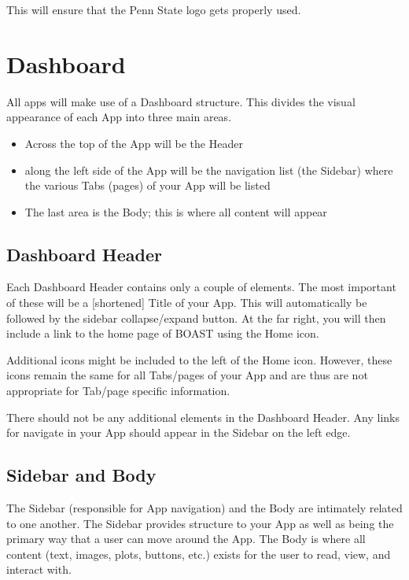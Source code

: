 \documentclass[]{book}
\providecommand{\tightlist}{%
  \setlength{\itemsep}{0pt}\setlength{\parskip}{0pt}}
\begin{document}
This will ensure that the Penn State logo gets properly used.

\hypertarget{dashboard}{%
\section{Dashboard}\label{dashboard}}

All apps will make use of a Dashboard structure. This divides the visual appearance of each App into three main areas.

\begin{itemize}
\tightlist
\item
  Across the top of the App will be the Header
\item
  along the left side of the App will be the navigation list (the Sidebar) where the various Tabs (pages) of your App will be listed
\item
  The last area is the Body; this is where all content will appear
\end{itemize}

\hypertarget{dashboard-header}{%
\subsection{Dashboard Header}\label{dashboard-header}}

Each Dashboard Header contains only a couple of elements. The most important of these will be a {[}shortened{]} Title of your App. This will automatically be followed by the sidebar collapse/expand button. At the far right, you will then include a link to the home page of BOAST using the Home icon.

Additional icons might be included to the left of the Home icon. However, these icons remain the same for all Tabs/pages of your App and are thus are not appropriate for Tab/page specific information.

There should not be any additional elements in the Dashboard Header. Any links for navigate in your App should appear in the Sidebar on the left edge.

\hypertarget{sidebar-and-body}{%
\subsection{Sidebar and Body}\label{sidebar-and-body}}

The Sidebar (responsible for App navigation) and the Body are intimately related to one another. The Sidebar provides structure to your App as well as being the primary way that a user can move around the App. The Body is where all content (text, images, plots, buttons, etc.) exists for the user to read, view, and interact with.
\end{document}

